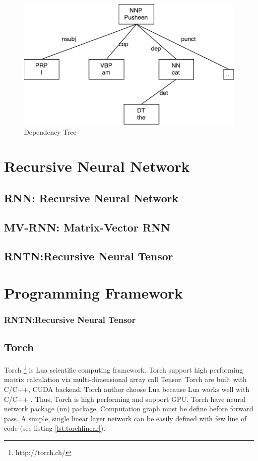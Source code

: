 \begin{figure}[H]
	\centering
	\includegraphics[width=0.7\linewidth]{figure/udexample}
	\caption[Dependency Tree]{Dependency Tree}
	\label{fig:udexample}
\end{figure}

\section{Recursive Neural Network}

\subsection{RNN: Recursive Neural Network}

\subsection{MV-RNN: Matrix-Vector RNN}

\subsection{RNTN:Recursive Neural Tensor}

\section{Programming Framework}
\subsubsection{RNTN:Recursive Neural Tensor}

\subsection{Torch}
Torch \footnote{http://torch.ch/} is Lua scientific computing framework. Torch support high performing matrix calculation via multi-dimensional array call Tensor. Torch are built with C/C++, CUDA backend. Torch author choose Lua because Lua works well with C/C++ \cite{collobert2011torch7}.  Thus, Torch is high performing and support GPU. Torch have neural network package (nn) package. Computation graph must be define before forward pass.
A simple, single linear layer network can be easily defined with few line of code (see listing \ref{lst:torchlinear}).

